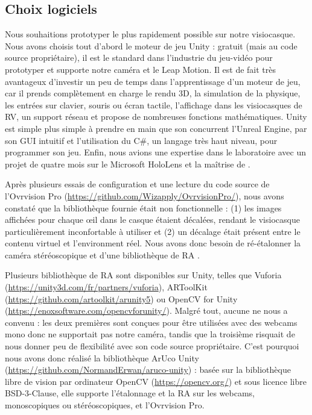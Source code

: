 \subsection{Choix logiciels}
\label{subsec:software_choices}
Nous souhaitions prototyper le plus rapidement possible sur notre visiocasque. Nous avons choisis tout d'abord le moteur de jeu Unity : gratuit (mais au code source propriétaire), il est le standard dans l'industrie du jeu-vidéo pour prototyper et supporte notre caméra et le Leap Motion. Il est de fait très avantageux d'investir un peu de temps dans l'apprentissage d'un moteur de jeu, car il prends complètement en charge le rendu 3D, la simulation de la physique, les entrées sur clavier, souris ou écran tactile, l'affichage dans les visiocasques de RV, un support réseau et propose de nombreuses fonctions mathématiques. Unity est simple plus simple à prendre en main que son concurrent l'Unreal Engine, par son GUI intuitif et l'utilisation du C\#, un langage très haut niveau, pour programmer son jeu. Enfin, nous avions une expertise dans le laboratoire avec un projet de quatre mois sur le Microsoft HoloLens et la maîtrise de \cite{Millette2016}.

Après plusieurs essais de configuration et une lecture du code source de l'Ovrvision Pro (\url{https://github.com/Wizapply/OvrvisionPro/}), nous avons constaté que la bibliothèque fournie était non fonctionnelle : (1) les images affichées pour chaque \oe il dans le casque étaient décalées, rendant le visiocasque particulièrement inconfortable à utiliser et (2) un décalage était présent entre le contenu virtuel et l'environment réel. Nous avons donc besoin de ré-étalonner la caméra stéréoscopique  et d'une bibliothèque de RA .

Plusieurs bibliothèque de RA sont disponibles sur Unity, telles que Vuforia (\url{https://unity3d.com/fr/partners/vuforia}), ARToolKit (\url{https://github.com/artoolkit/arunity5}) ou OpenCV for Unity (\url{https://enoxsoftware.com/opencvforunity/}). Malgré tout, aucune ne nous a convenu : les deux premières sont conçues pour être utilisées avec des webcams mono donc ne supportait pas notre caméra, tandis que la troisième risquait de nous donner peu de flexibilité avec son code source propriétaire. C'est pourquoi nous avons donc réalisé la bibliothèque ArUco Unity (\url{https://github.com/NormandErwan/aruco-unity}) : basée sur la bibliothèque libre de vision par ordinateur OpenCV (\url{https://opencv.org/}) et sous licence libre BSD-3-Clause, elle supporte l'étalonnage et la RA sur les webcams, monoscopiques ou stéréoscopiques, et l'Ovrvision Pro.


